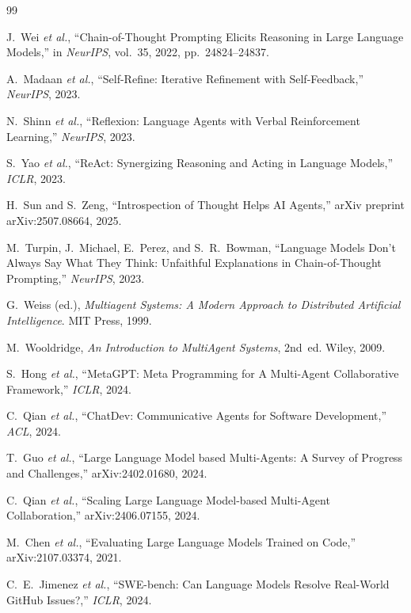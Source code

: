 \begin{thebibliography}{99}

J.~Wei \emph{et al.}, ``Chain-of-Thought Prompting Elicits Reasoning in Large Language Models,'' in \emph{NeurIPS}, vol.~35, 2022, pp.~24824--24837.

A.~Madaan \emph{et al.}, ``Self-Refine: Iterative Refinement with Self-Feedback,'' \emph{NeurIPS}, 2023.

N.~Shinn \emph{et al.}, ``Reflexion: Language Agents with Verbal Reinforcement Learning,'' \emph{NeurIPS}, 2023.

S.~Yao \emph{et al.}, ``ReAct: Synergizing Reasoning and Acting in Language Models,'' \emph{ICLR}, 2023.

H.~Sun and S.~Zeng, ``Introspection of Thought Helps AI Agents,'' arXiv preprint arXiv:2507.08664, 2025.

M.~Turpin, J.~Michael, E.~Perez, and S.~R.~Bowman, ``Language Models Don't Always Say What They Think: Unfaithful Explanations in Chain-of-Thought Prompting,'' \emph{NeurIPS}, 2023.

G.~Weiss (ed.), \emph{Multiagent Systems: A Modern Approach to Distributed Artificial Intelligence}. MIT Press, 1999.

M.~Wooldridge, \emph{An Introduction to MultiAgent Systems}, 2nd~ed. Wiley, 2009.

S.~Hong \emph{et al.}, ``MetaGPT: Meta Programming for A Multi-Agent Collaborative Framework,'' \emph{ICLR}, 2024.

C.~Qian \emph{et al.}, ``ChatDev: Communicative Agents for Software Development,'' \emph{ACL}, 2024.

T.~Guo \emph{et al.}, ``Large Language Model based Multi-Agents: A Survey of Progress and Challenges,'' arXiv:2402.01680, 2024.

C.~Qian \emph{et al.}, ``Scaling Large Language Model-based Multi-Agent Collaboration,'' arXiv:2406.07155, 2024.

M.~Chen \emph{et al.}, ``Evaluating Large Language Models Trained on Code,'' arXiv:2107.03374, 2021.

C.~E.~Jimenez \emph{et al.}, ``SWE-bench: Can Language Models Resolve Real-World GitHub Issues?,'' \emph{ICLR}, 2024.


\end{thebibliography}
